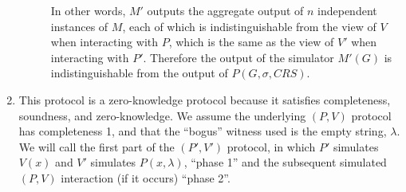 \documentclass[draft]{article}
\begin{document}
\begin{enumerate}
\begin{description}
    In other words, $M'$ outputs the aggregate output of $n$ independent instances of $M$, each of which is indistinguishable from the view of $V$ when interacting with $P$, which is the same as the view of $V'$ when interacting with $P'$.
    Therefore the output of the simulator $M'(G)$ is indistinguishable from the output of $P(G, \sigma, CRS)$.
  \end{description}
\item 
  This protocol is a zero-knowledge protocol because it satisfies completeness, soundness, and zero-knowledge.
  We assume the underlying $(P, V)$ protocol has completeness 1, and that the ``bogus'' witness used is the empty string, $\lambda$.
  We will call the first part of the $(P', V')$ protocol, in which $P'$ simulates $V(x)$ and $V'$ simulates $P(x, \lambda)$, ``phase 1'' and the subsequent simulated $(P, V)$ interaction (if it occurs) ``phase 2''.


\end{enumerate}
\end{document}
